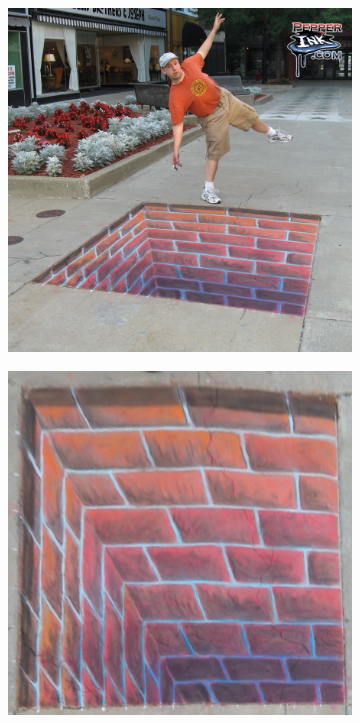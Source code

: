 \documentclass{article}
\begin{document}
\begin{figure}[H]
    \centering
    \begin{subfigure}{.3\textwidth}
        \centering
        \includegraphics[width=\textwidth]{q3/bricks.jpg}
    \end{subfigure}
    \begin{subfigure}{.3\textwidth}
        \centering
        \includegraphics[width=\textwidth]{q3/output.jpg}
        \label{fig 1}
    \end{subfigure}
\end{figure}
\end{document}
